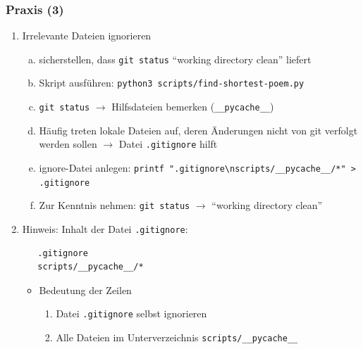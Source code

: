 \documentclass{beamer}
\begin{document}
\begin{frame}[fragile,label=uebung30]
\frametitle{Praxis (3)}
\begin{enumerate}
 \setcounter{enumi}{\value{taskcounter}}

  \item Irrelevante Dateien ignorieren
  \begin{enumerate}[a)]
   \item sicherstellen, dass \verb|git status| "`working directory clean"' liefert
   \item Skript ausführen: \verb|python3 scripts/find-shortest-poem.py|
   \item \verb|git status| $\rightarrow$ Hilfsdateien bemerken (\verb|__pycache__|)
   \item[] {\scriptsize Häufig treten lokale Dateien auf, deren Änderungen nicht von git verfolgt werden sollen
   $\rightarrow$ Datei \verb|.gitignore| hilft}
   \item ignore-Datei anlegen: \verb|printf ".gitignore\nscripts/__pycache__/*" > .gitignore|
   \item Zur Kenntnis nehmen: \verb|git status| $\rightarrow$ "`working directory clean"'
  \end{enumerate}
  \bigskip
  \item[] Hinweis: Inhalt der Datei \verb|.gitignore|:
  \begin{verbatim}
   .gitignore
   scripts/__pycache__/*
  \end{verbatim}
  \begin{itemize}
  \item Bedeutung der Zeilen
  \begin{enumerate}
   \item Datei    \verb|.gitignore| selbst ignorieren
   \item Alle Dateien im Unterverzeichnis \verb|scripts/__pycache__|
  \end{enumerate}

  \end{itemize}
 \setcounter{taskcounter}{\value{enumi}}
\end{enumerate}
\end{frame}
\end{document}
